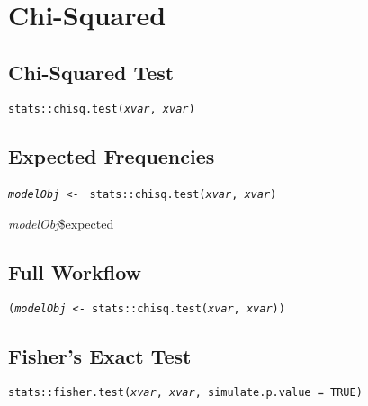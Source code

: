 \documentclass{tufte-handout}
\newenvironment{subs}
  {\adjustwidth{3em}{0pt}}
  {\endadjustwidth}
\begin{document}
\vspace{5mm}
\section{Chi-Squared}
\begin{subs}
\subsection{Chi-Squared Test}
\noindent \texttt{stats::}{\color{red}\texttt{chisq.test}}\texttt{(\textit{xvar}, \textit{xvar})}

\vspace{3mm}
\subsection{Expected Frequencies}
\noindent \texttt{\textit{modelObj} <- } \texttt{stats::}{\color{red}\texttt{chisq.test}}\texttt{(\textit{xvar}, \textit{xvar})}
\par \noindent \textit{modelObj}\$expected

\vspace{3mm}
\subsection{Full Workflow}
\noindent \texttt{(\textit{modelObj} <- stats::}{\color{red}\texttt{chisq.test}}\texttt{(\textit{xvar}, \textit{xvar}))}

\vspace{3mm}
\subsection{Fisher's Exact Test}
\noindent \texttt{stats::}{\color{red}\texttt{fisher.test}}\texttt{(\textit{xvar}, \textit{xvar}, simulate.p.value = TRUE)}
\end{subs}

\end{document}
